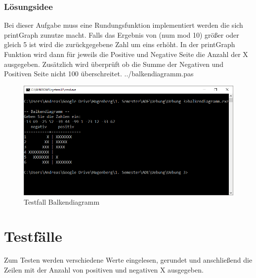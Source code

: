 \subsubsection*{Lösungsidee}
Bei dieser Aufgabe muss eine Rundungsfunktion implementiert werden die sich printGraph zunutze macht. Falls das Ergebnis von (num mod 10) größer oder gleich 5 ist wird die zurückgegebene Zahl um eins erhöht. In der printGraph Funktion wird dann für jeweils die Positive und Negative Seite die Anzahl der X ausgegeben. Zusätzlich wird überprüft ob die Summe der Negativen und Positiven Seite nicht 100 überschreitet.
\newline
 {../balkendiagramm.pas}
\begin{figure}[H]
	\centering
	\includegraphics[scale=0.75]{./pictures/balkendiagramm.png}
	\caption{Testfall Balkendiagramm}
	\label{fig: label}
\end{figure}

\section*{Testfälle}
Zum Testen werden verschiedene Werte eingelesen, gerundet und anschließend die Zeilen mit der Anzahl von positiven und negativen X ausgegeben.

\newpage